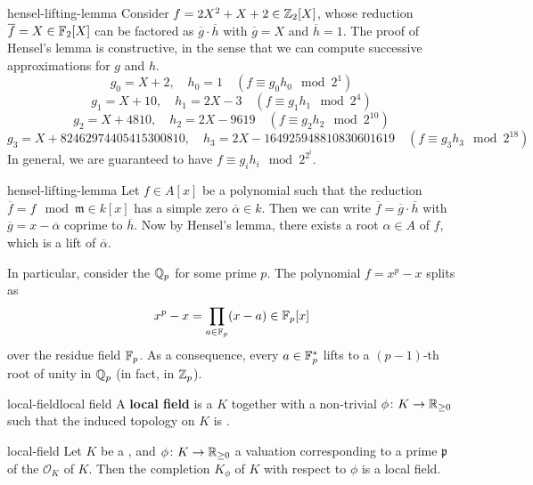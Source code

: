 \begin{example}{hensel-lifting-lemma}
    Consider $f = 2X^2 + X + 2 \in \mathbb{Z}_2[X]$, whose reduction $\overline{f} = X \in \mathbb{F}_2[X]$ can be factored as $\overline{g} \cdot \overline{h}$ with $\overline{g} = X$ and $\overline{h} = 1$. The proof of Hensel's lemma is constructive, in the sense that we can compute successive approximations for $g$ and $h$.
    \[ g_0 = X + 2, \quad h_0 = 1 \quad (f \equiv g_0 h_0 \mod 2^1) \]
    \[ g_1 = X + 10, \quad h_1 = 2X - 3 \quad (f \equiv g_1 h_1 \mod 2^4) \]
    \[ g_2 = X + 4810, \quad h_2 = 2X - 9619 \quad (f \equiv g_2 h_2 \mod 2^{10}) \]
    \[ g_3 = X + 82462974405415300810, \quad h_3 = 2X - 164925948810830601619 \quad (f \equiv g_3 h_3 \mod 2^{18}) \]
    In general, we are guaranteed to have $f \equiv g_i h_i \mod 2^{2^i}$.
\end{example}

\begin{example}{hensel-lifting-lemma}
    Let $f \in A[x]$ be a polynomial such that the reduction $\overline{f} = f \mod \mathfrak{m} \in k[x]$ has a simple zero $\overline{\alpha} \in k$. Then we can write $\overline{f} = \overline{g} \cdot \overline{h}$ with $\overline{g} = x - \overline{\alpha}$ coprime to $\overline{h}$. Now by Hensel's lemma, there exists a root $\alpha \in A$ of $f$, which is a lift of $\overline{\alpha}$.
    
    In particular, consider the  $\mathbb{Q}_p$ for some prime $p$. The polynomial $f = x^p - x$ splits as
    \[ x^p - x = \prod_{a \in \mathbb{F}_p} (x - a) \in \mathbb{F}_p[x] \]
    over the residue field $\mathbb{F}_p$. As a consequence, every $a \in \mathbb{F}_p^*$ lifts to a $(p - 1)$-th root of unity in $\mathbb{Q}_p$ (in fact, in $\mathbb{Z}_p$).
\end{example}

\begin{topic}{local-field}{local field}
    A \textbf{local field} is a  $K$ together with a non-trivial  $\phi \colon K \to \mathbb{R}_{\ge 0}$ such that the induced topology on $K$ is .
\end{topic}

\begin{example}{local-field}
    Let $K$ be a , and $\phi \colon K \to \mathbb{R}_{\ge 0}$ a valuation corresponding to a prime $\mathfrak{p}$ of the  $\mathcal{O}_K$ of $K$. Then the completion $K_\phi$ of $K$ with respect to $\phi$ is a local field.
\end{example}

